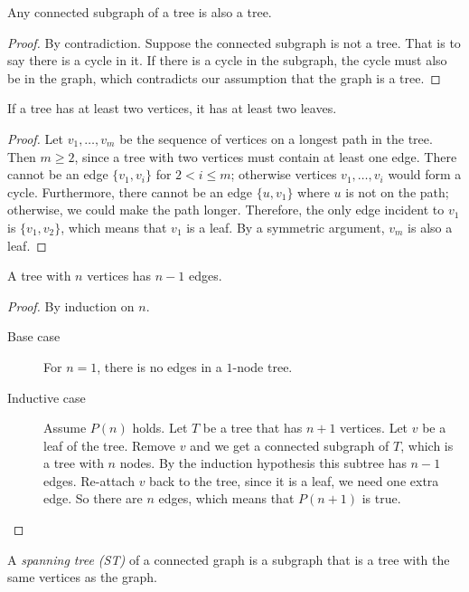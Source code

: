 \documentclass[11pt]{article}
\begin{document}
\begin{lemma}
Any connected subgraph of a tree is also a tree.
\end{lemma}

\begin{proof}
By contradiction. Suppose the connected subgraph is not a tree. That is to say there is a cycle in
it. If there is a cycle in the subgraph, the cycle must also be in the graph, which contradicts our
assumption that the graph is a tree.
\end{proof}

\begin{theorem}
If a tree has at least two vertices, it has at least two leaves.
\end{theorem}

\begin{proof}
Let $v_1,\dots,v_m$ be the sequence of vertices on a longest path in the tree. Then $m \geq 2$, since a
tree with two vertices must contain at least one edge. There cannot be an edge $\{v_1,v_i\}$ for
$2 < i \leq m$; otherwise vertices $v_1,\dots,v_i$ would form a cycle. Furthermore, there cannot be an
edge $\{u,v_1\}$ where $u$ is not on the path; otherwise, we could make the path longer. Therefore, the
only edge incident to $v_1$ is $\{v_1,v_2\}$, which means that $v_1$ is a leaf. By a symmetric argument,
$v_m$ is also a leaf.
\end{proof}

\begin{lemma}
A tree with $n$ vertices has $n-1$ edges.
\end{lemma}

\begin{proof}
By induction on $n$.

\begin{description}
\item[Base case] For $n=1$, there is no edges in a $1$-node tree.
\item[Inductive case] Assume $P(n)$ holds. Let $T$ be a tree that has $n+1$ vertices. Let $v$ be a
leaf of the tree. Remove $v$ and we get a connected subgraph of $T$, which is a tree with $n$ nodes.
By the induction hypothesis this subtree has $n-1$ edges. Re-attach $v$ back to the tree, since it is
a leaf, we need one extra edge. So there are $n$ edges, which means that $P(n+1)$ is true.
\end{description}
\end{proof}

\begin{definition}
A \emph{spanning tree (ST)} of a connected graph is a subgraph that is a tree with the same vertices
as the graph.
\end{definition}
\end{document}
